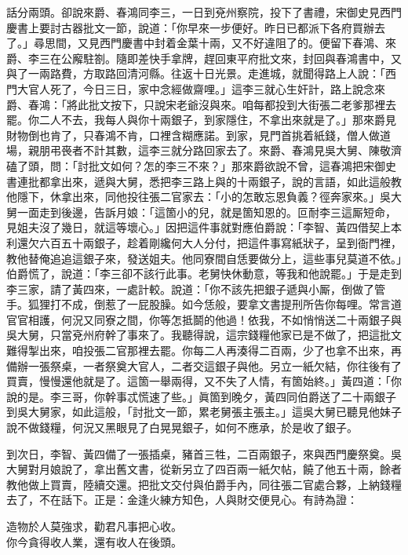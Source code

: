 話分兩頭。卻說來爵、春鴻同李三，一日到兗州察院，投下了書禮，宋御史見西門慶書上要討古器批文一節，說道：「你早來一步便好。昨日已都派下各府買辦去了。」尋思間，又見西門慶書中封着金葉十兩，又不好違阻了的。便留下春鴻、來爵、李三在公廨駐劄。隨即差快手拿牌，趕回東平府批文來，封回與春鴻書中，又與了一兩路費，方取路回清河縣。往返十日光景。走進城，就聞得路上人說：「西門大官人死了，今日三日，家中念經做齋哩。」這李三就心生奸計，路上說念來爵、春鴻：「將此批文按下，只說宋老爺沒與來。咱每都投到大街張二老爹那裡去罷。{}你二人不去，我每人與你十兩銀子，到家隱住，不拿出來就是了。」那來爵見財物倒也肯了，只春鴻不肯，口裡含糊應諾。{}到家，見門首挑着紙錢，僧人做道場，親朋弔䘮者不計其數，這李三就分路回家去了。來爵、春鴻見吳大舅、陳敬濟磕了頭，問：「討批文如何？怎的李三不來？」那來爵欲說不曾，這春鴻把宋御史書連批都拿出來，遞與大舅，悉把李三路上與的十兩銀子，說的言語，如此這般教他隱下，休拿出來，同他投往張二官家去：「小的怎敢忘恩負義？徑奔家來。」吳大舅一面走到後邊，告訴月娘：「這箇小的兒，就是箇知恩的。叵耐李三這厮短命，見姐夫沒了幾日，就這等壞心。」{}因把這件事就對應伯爵說：「李智、黃四借契上本利還欠六百五十兩銀子，趁着剛纔何大人分付，把這件事寫紙狀子，呈到衙門裡，教他替俺追追這銀子來，發送姐夫。他同寮間自恁要做分上，這些事兒莫道不依。」伯爵慌了，說道：「李三卻不該行此事。老舅快休動意，等我和他說罷。」于是走到李三家，請了黃四來，一處計較。說道：「你不該先把銀子遞與小厮，倒做了管手。狐狸打不成，倒惹了一屁股臊。如今恁般，要拿文書提刑所告你每哩。常言道官官相護，何況又同寮之間，你等怎抵鬬的他過！依我，不如悄悄送二十兩銀子與吳大舅，只當兗州府幹了事來了。我聽得說，這宗錢糧他家已是不做了，把這批文難得掣出來，咱投張二官那裡去罷。你每二人再湊得二百兩，少了也拿不出來，再備辦一張祭桌，一者祭奠大官人，二者交這銀子與他。另立一紙欠結，你往後有了買賣，慢慢還他就是了。這箇一舉兩得，又不失了人情，有箇始終。」{}黃四道：「你說的是。李三哥，你幹事忒慌速了些。」眞箇到晚夕，黃四同伯爵送了二十兩銀子到吳大舅家，如此這般，「討批文一節，累老舅張主張主。」這吳大舅已聽見他妹子說不做錢糧，何況又黑眼見了白晃晃銀子，如何不應承，於是收了銀子。

到次日，李智、黃四備了一張插桌，豬首三牲，二百兩銀子，來與西門慶祭奠。吳大舅對月娘說了，拿出舊文書，從新另立了四百兩一紙欠帖，饒了他五十兩，餘者教他做上買賣，陸續交還。把批文交付與伯爵手內，同往張二官處合夥，上納錢糧去了，不在話下。正是：金逢火練方知色，人與財交便見心。有詩為證：

\begin{myquote} 
造物於人莫強求，勸君凡事把心收。\\你今貪得收人業，還有收人在後頭。{}
\end{myquote} 

